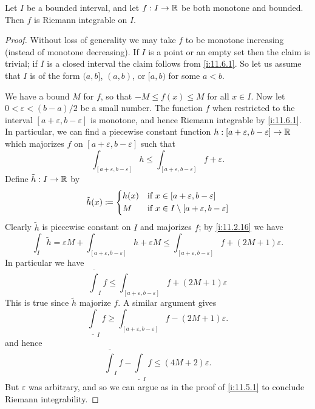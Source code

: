 \begin{cor}\label{i:11.6.3}
  Let \(I\) be a bounded interval, and let \(f : I \to \mathbb{R}\) be both monotone and bounded.
  Then \(f\) is Riemann integrable on \(I\).
\end{cor}

\begin{proof}
  Without loss of generality we may take \(f\) to be monotone increasing (instead of monotone decreasing).
  If \(I\) is a point or an empty set then the claim is trivial;
  if \(I\) is a closed interval the claim follows from \cref{i:11.6.1}.
  So let us assume that \(I\) is of the form \((a, b]\), \((a, b)\), or \([a, b)\) for some \(a < b\).

  We have a bound \(M\) for \(f\), so that \(-M \leq f(x) \leq M\) for all \(x \in I\).
  Now let \(0 < \varepsilon < (b - a) / 2\) be a small number.
  The function \(f\) when restricted to the interval \([a + \varepsilon, b - \varepsilon]\) is monotone, and hence Riemann integrable by \cref{i:11.6.1}.
  In particular, we can find a piecewise constant function \(h : [a + \varepsilon, b - \varepsilon] \to \mathbb{R}\) which majorizes \(f\) on \([a + \varepsilon, b - \varepsilon]\) such that
  \[
    \int_{[a + \varepsilon, b - \varepsilon]} h \leq \int_{[a + \varepsilon, b - \varepsilon]} f + \varepsilon.
  \]
  Define \(\tilde{h} : I \to \mathbb{R}\) by
  \[
    \tilde{h}(x) \coloneqq \begin{dcases}
      h(x) & \text{if } x \in [a + \varepsilon, b - \varepsilon]             \\
      M    & \text{if } x \in I \setminus [a + \varepsilon, b - \varepsilon]
    \end{dcases}
  \]
  Clearly \(\tilde{h}\) is piecewise constant on \(I\) and majorizes \(f\);
  by \cref{i:11.2.16} we have
  \[
    \int_I \tilde{h} = \varepsilon M + \int_{[a + \varepsilon, b - \varepsilon]} h + \varepsilon M \leq \int_{[a + \varepsilon, b - \varepsilon]} f + (2M + 1) \varepsilon.
  \]
  In particular we have
  \[
    \overline{\int}_I f \leq \int_{[a + \varepsilon, b - \varepsilon]} f + (2M + 1) \varepsilon
  \]
  This is true since \(\tilde{h}\) majorize \(f\).
  A similar argument gives
  \[
    \underline{\int}_I f \geq \int_{[a + \varepsilon, b - \varepsilon]} f - (2M + 1) \varepsilon.
  \]
  and hence
  \[
    \overline{\int}_I f - \underline{\int}_I f \leq (4M + 2) \varepsilon.
  \]
  But \(\varepsilon\) was arbitrary, and so we can argue as in the proof of \cref{i:11.5.1} to conclude Riemann integrability.
\end{proof}

